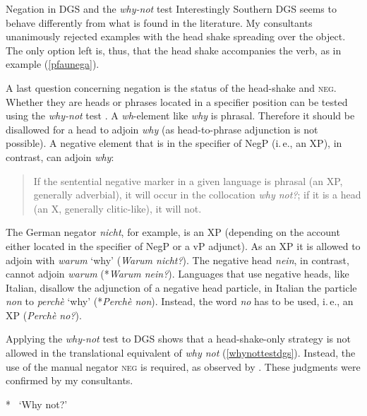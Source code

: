 \begin{digression}{Negation in DGS and the \textit{why-not} test}{}
Interestingly Southern DGS seems to behave differently from what is found in the literature. My consultants unanimously rejected examples with the head shake spreading over the object. The only option left is, thus, that the head shake accompanies the verb, as in example (\ref{pfaunega}). 

A last question concerning negation is the status of the head-shake and \textsc{neg}. Whether they are heads or phrases located in a specifier position can be tested using the \textit{why-not} test \citep{merchant2006no, zeijlstra2015morpho}. A \textit{wh}-element like \textit{why} is phrasal. Therefore it should be disallowed for a head to adjoin \textit{why} (as head-to-phrase adjunction is not possible).  A negative element that is in the specifier of NegP (i.\,e., an XP), in contrast, can adjoin \textit{why}:

\begin{quote}
If the sentential negative marker in a given language is phrasal (an XP, generally adverbial), it will occur in the collocation \textit{why not?}; if it is a head (an X\textdegree , generally clitic-like), it will not. \citep[20]{merchant2006no}
\end{quote}

\noindent The German negator \textit{nicht}, for example, is an XP (depending on the account either located in the specifier of NegP or a vP adjunct). As an XP it is allowed to adjoin with \textit{warum} `why' (\textit{Warum nicht?}). The negative head \textit{nein}, in contrast, cannot adjoin \textit{warum} (*\textit{Warum nein?}). Languages that use negative heads, like Italian, disallow the adjunction of a negative head particle, in Italian the particle \textit{non} to \textit{perchè} `why' (*\textit{Perchè non}). Instead, the word \textit{no} has to be used, i.\,e., an XP (\textit{Perchè no?}). 

Applying the \textit{why-not} test to DGS shows that a head-shake-only strategy is not allowed in the translational equivalent of \textit{why not} (\ref{whynottestdgs}). Instead, the use of the manual negator \textsc{neg} is required, as observed by \citet[56]{pfau2016featural}. These judgments were confirmed by my consultants. 

\begin{exe}
\ex\label{whynottestdgs}\begin{xlist}
\ex\label{ex:modaldoublingneg} *
\glt \textcolor{white}{*}`Why not?'


\end{xlist}
\end{exe}
\end{digression}
